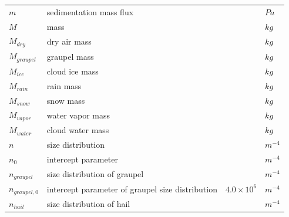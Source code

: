 \documentclass[letterpaper,titlepage,10pt]{article}
\numberwithin{equation}{section}
\begin{document}
\begin{appendices}
\begin{longtable}{p{}p{}p{}p{}}
	$m$                & sedimentation mass flux                                                              &                            & $Pa$ \\
	$M$                & mass                                                                                 &                            & $kg$ \\
	$M_{dry}$          & dry air mass                                                                         &                            & $kg$ \\
	$M_{graupel}$      & graupel mass                                                                         &                            & $kg$ \\
	$M_{ice}$          & cloud ice mass                                                                       &                            & $kg$ \\
	$M_{rain}$         & rain mass                                                                            &                            & $kg$ \\
	$M_{snow}$         & snow mass                                                                            &                            & $kg$ \\
	$M_{vapor}$        & water vapor mass                                                                     &                            & $kg$ \\
	$M_{water}$        & cloud water mass                                                                     &                            & $kg$ \\
	$n$                & size distribution                                                                    &                            & $m^{-4}$ \\
	$n_0$              & intercept parameter                                                                  &                            & $m^{-4}$ \\
    $n_{graupel}$      & size distribution of graupel                                                         &                            & $m^{-4}$ \\
    $n_{graupel,0}$    & intercept parameter of graupel size distribution                                     & $4.0 \times 10^{6}$        & $m^{-4}$ \\
    $n_{hail}$         & size distribution of hail                                                            &                            & $m^{-4}$ \\

\end{longtable}
\end{appendices}
\end{document}
